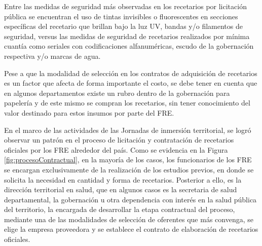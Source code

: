 \documentclass[
  oneside]{book}
\begin{document}
Entre las medidas de seguridad más observadas en los recetarios por licitación pública se encuentran el uso de tintas invisibles o fluorescentes en secciones específicas del recetario que brillan bajo la luz UV, bandas y/o filamentos de seguridad, versus las medidas de seguridad de recetarios realizados por mínima cuantía como seriales con codificaciones alfanuméricas, escudo de la gobernación respectiva y/o marcas de agua.

Pese a que la modalidad de selección en los contratos de adquisición de recetarios es un factor que afecta de forma importante el costo, se debe tener en cuenta que en algunos departamentos existe un rubro dentro de la gobernación para papelería y de este mismo se compran los recetarios, sin tener conocimiento del valor destinado para estos insumos por parte del FRE.

En el marco de las actividades de las Jornadas de inmersión territorial, se logró observar un patrón en el proceso de licitación y contratación de recetarios oficiales por los FRE alrededor del país. Como se evidencia en la Figura \ref{fig:procesoContractual}, en la mayoría de los casos, los funcionarios de los FRE se encargan exclusivamente de la realización de los estudios previos, en donde se solicita la necesidad en cantidad y forma de recetarios. Posterior a ello, es la dirección territorial en salud, que en algunos casos es la secretaria de salud departamental, la gobernación u otra dependencia con interés en la salud pública del territorio, la encargada de desarrollar la etapa contractual del proceso, mediante una de las modalidades de selección de oferentes que más convenga, se elige la empresa proveedora y se establece el contrato de elaboración de recetarios oficiales.
\end{document}
